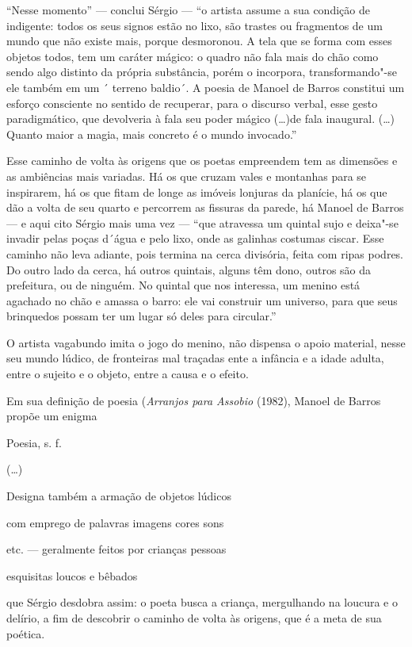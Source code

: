 ``Nesse momento'' --- conclui Sérgio --- ``o artista assume a sua condição
de indigente: todos os seus signos estão no lixo, são trastes ou
fragmentos de um mundo que não existe mais, porque desmoronou. A tela
que se forma com esses objetos todos, tem um caráter mágico: o quadro
não fala mais do chão como sendo algo distinto da própria substância,
porém o incorpora, transformando"-se ele também em um ´ terreno baldio´.
A poesia de Manoel de Barros constitui um esforço consciente no sentido
de recuperar, para o discurso verbal, esse gesto paradigmático, que
devolveria à fala seu poder mágico (\ldots{})de fala inaugural. (\ldots{}) Quanto
maior a magia, mais concreto é o mundo invocado.''

Esse caminho de volta às origens que os poetas empreendem tem as
dimensões e as ambiências mais variadas. Há os que cruzam vales e
montanhas para se inspirarem, há os que fitam de longe as imóveis
lonjuras da planície, há os que dão a volta de seu quarto e percorrem as
fissuras da parede, há Manoel de Barros --- e aqui cito Sérgio mais uma
vez --- ``que atravessa um quintal sujo e deixa"-se invadir pelas poças
d´água e pelo lixo, onde as galinhas costumas ciscar. Esse caminho não
leva adiante, pois termina na cerca divisória, feita com ripas podres.
Do outro lado da cerca, há outros quintais, alguns têm dono, outros são
da prefeitura, ou de ninguém. No quintal que nos interessa, um menino
está agachado no chão e amassa o barro: ele vai construir um universo,
para que seus brinquedos possam ter um lugar só deles para circular.''

O artista vagabundo imita o jogo do menino, não dispensa o apoio
material, nesse seu mundo lúdico, de fronteiras mal traçadas ente a
infância e a idade adulta, entre o sujeito e o objeto, entre a causa e o
efeito.

Em sua definição de poesia (\emph{Arranjos para Assobio} (1982), Manoel
de Barros propõe um enigma

{Poesia}, s. f.

(\ldots{})

Designa também a armação de objetos lúdicos

com emprego de palavras imagens cores sons

etc. --- geralmente feitos por crianças pessoas

esquisitas loucos e bêbados

que Sérgio desdobra assim: o poeta busca a criança, mergulhando na
loucura e o delírio, a fim de descobrir o caminho de volta às origens,
que é a meta de sua poética.

